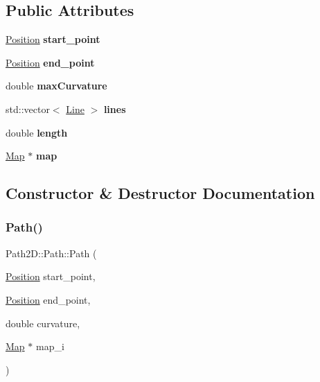 \subsection*{Public Attributes}
\begin{DoxyCompactItemize}
\item 
\mbox{\label{class_path2_d_1_1_path_ab306f2171e6829314ed3f92f75132b58}} 
\mbox{\hyperlink{class_path2_d_1_1_element_1_1_position}{Position}} {\bfseries start\+\_\+point}
\item 
\mbox{\label{class_path2_d_1_1_path_ab53e409ea5e8b47f1b125cec56f90552}} 
\mbox{\hyperlink{class_path2_d_1_1_element_1_1_position}{Position}} {\bfseries end\+\_\+point}
\item 
\mbox{\label{class_path2_d_1_1_path_add4022211d8ce266c0d9aa088daff289}} 
double {\bfseries max\+Curvature}
\item 
\mbox{\label{class_path2_d_1_1_path_a654d60629e1d23f57d4ff99604ebf07a}} 
std\+::vector$<$ \mbox{\hyperlink{class_path2_d_1_1_element_1_1_line}{Line}} $>$ {\bfseries lines}
\item 
\mbox{\label{class_path2_d_1_1_path_acd25ac5dc56b47600cf7efa8ba5ae3ac}} 
double {\bfseries length}
\item 
\mbox{\label{class_path2_d_1_1_path_ae8bacd1d5855465b7e2f6f540e1e3e88}} 
\mbox{\hyperlink{class_map}{Map}} $\ast$ {\bfseries map}
\end{DoxyCompactItemize}


\subsection{Constructor \& Destructor Documentation}
\mbox{\label{class_path2_d_1_1_path_ae91ac6b923538c7c6ba6645f5866b848}} 
\subsubsection{\texorpdfstring{Path()}{Path()}}
{\footnotesize\ttfamily Path2\+D\+::\+Path\+::\+Path (\begin{DoxyParamCaption}\item[{\mbox{\hyperlink{class_path2_d_1_1_element_1_1_position}{Position}}}]{start\+\_\+point,  }\item[{\mbox{\hyperlink{class_path2_d_1_1_element_1_1_position}{Position}}}]{end\+\_\+point,  }\item[{double}]{curvature,  }\item[{\mbox{\hyperlink{class_map}{Map}} $\ast$}]{map\+\_\+i }\end{DoxyParamCaption})}



